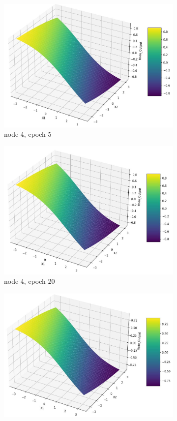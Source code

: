 \documentclass[11pt]{article}
\begin{document}
\begin{figure}[h]
\begin{subfigure}[b]{0.18\textwidth}
	\includegraphics[scale=0.14]{hidden1_n4_e5.jpg}
	\caption{node 4, epoch 5}
	\label{fig:fig2.1.4.17}
	\end{subfigure}
	\begin{subfigure}[b]{0.18\textwidth}
	\centering
	\includegraphics[scale=0.14]{hidden1_n4_e20.jpg}
	\caption{node 4, epoch 20}
	\label{fig:fig2.1.4.18}
	\end{subfigure}
	\begin{subfigure}[b]{0.18\textwidth}
	\centering
	\includegraphics[scale=0.14]{hidden1_n4_e100.jpg}

\end{subfigure}
\end{figure}
\end{document}
